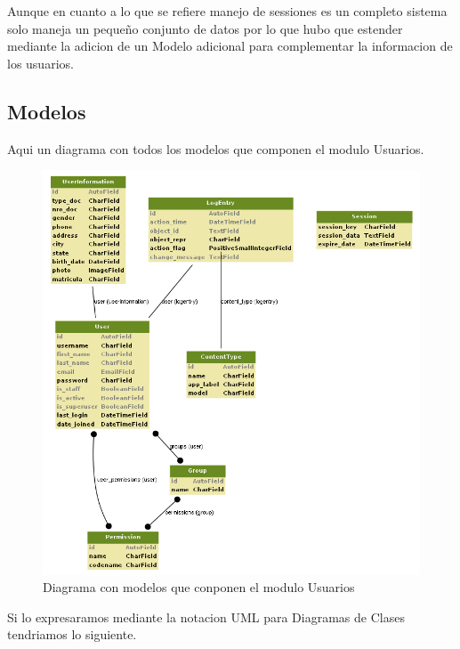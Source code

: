 Aunque en cuanto a lo que se refiere manejo de sessiones es un completo sistema
solo maneja un peque\~no conjunto de datos por lo que hubo que estender mediante 
la adicion de un Modelo adicional para complementar la informacion de los 
usuarios.

\subsection{Modelos}

Aqui un diagrama con todos los modelos que componen el modulo Usuarios.

\begin{figure}[H]
    \centering
    \includegraphics[scale=0.7]{resourse/auth.png}
    \caption{Diagrama con modelos que conponen el modulo Usuarios}
    \label{fig:07}
\end{figure}

Si lo expresaramos mediante la notacion UML para Diagramas de Clases 
tendriamos lo siguiente.

